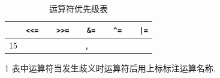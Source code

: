 \begin{table}[htbp]
\begin{threeparttable}
\begin{tabular}{|c|c|}
                        & \texttt{<<=} \ \ \ \texttt{>>=} \ \ \ \texttt{\&=} \ \ \ \texttt{\^{}=} \ \ \ \texttt{|=} \\
                \hline
                15      & \texttt{,} \\
                \hline
            \end{tabular}
            \begin{tablenotes}
                \item[1] 表中运算符当发生歧义时运算符后用上标标注运算名称.
            \end{tablenotes}
            \caption{运算符优先级表} \label{运算符优先级表} 
        \end{threeparttable}
    \end{table}
